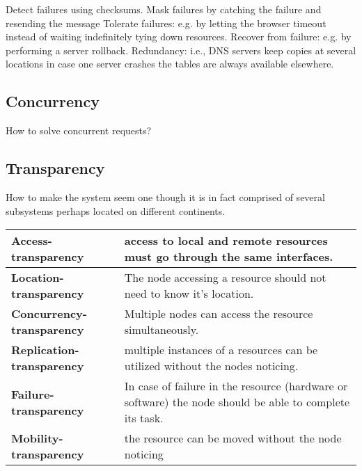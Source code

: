 Detect failures using checksums.
Mask failures by catching the failure and resending the message 
Tolerate failures:  e.g. by letting the browser timeout instead of waiting indefinitely tying down resources. 
Recover from failure: e.g. by performing a server rollback.
Redundancy: i.e., DNS servers keep copies at several locations in case one server crashes the tables are always available elsewhere. 

\subsection{Concurrency}
How to solve concurrent requests? 

\subsection{Transparency}

How to make the system seem one though it is in fact comprised of several subsystems perhaps located on different continents.

 \label{tab:title}
\begin{tabular}{L{1.0in} L{3.45in} }    %
\toprule[1.5pt] %
\textbf{Access-\newline transparency} & access to local and remote resources must go through the same  interfaces. \\\midrule
\textbf{Location- \newline transparency} & The node accessing a resource should not need to know it’s location. \\\midrule
\textbf{Concurrency-\newline transparency} & Multiple nodes can access the resource simultaneously. \\\midrule
\textbf{Replication-\newline transparency} & multiple instances of a resources can be utilized without the nodes noticing.\\\midrule
\textbf{Failure-\newline transparency} & In case of failure in the resource (hardware or software) the node should be able to complete its task.\\\midrule
\textbf{Mobility-\newline transparency} & the resource can be moved without the node noticing\\
\bottomrule[1.25pt] %
\end {tabular}\par
\bigskip


